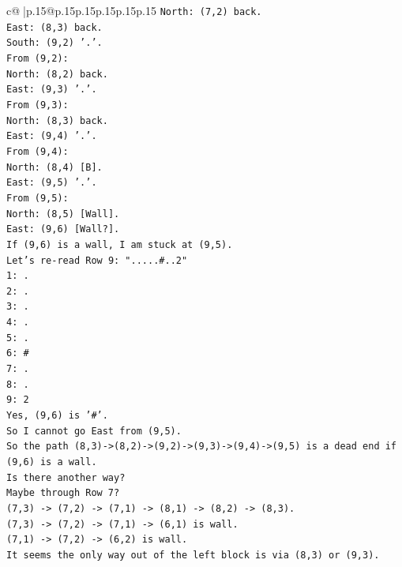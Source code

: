 \documentclass{article}
\begin{document}
{\begin{supertabular}{c@{$\;$}|p{.15\linewidth}@{}p{.15\linewidth}p{.15\linewidth}p{.15\linewidth}p{.15\linewidth}p{.15\linewidth}}
{{{\texttt{North: (7,2) back.} \\
\texttt{East: (8,3) back.} \\
\texttt{South: (9,2) '.'.} \\
\texttt{From (9,2):} \\
\texttt{North: (8,2) back.} \\
\texttt{East: (9,3) '.'.} \\
\texttt{From (9,3):} \\
\texttt{North: (8,3) back.} \\
\texttt{East: (9,4) '.'.} \\
\texttt{From (9,4):} \\
\texttt{North: (8,4) {[}B{]}.} \\
\texttt{East: (9,5) '.'.} \\
\texttt{From (9,5):} \\
\texttt{North: (8,5) {[}Wall{]}.} \\
\texttt{East: (9,6) {[}Wall?{]}.} \\
\texttt{If (9,6) is a wall, I am stuck at (9,5).} \\
\texttt{Let's re{-}read Row 9: ".....\#..2"} \\
\texttt{1: .} \\
\texttt{2: .} \\
\texttt{3: .} \\
\texttt{4: .} \\
\texttt{5: .} \\
\texttt{6: \#} \\
\texttt{7: .} \\
\texttt{8: .} \\
\texttt{9: 2} \\
\texttt{Yes, (9,6) is '\#'.} \\
\texttt{So I cannot go East from (9,5).} \\
\texttt{So the path (8,3){-}>(8,2){-}>(9,2){-}>(9,3){-}>(9,4){-}>(9,5) is a dead end if (9,6) is a wall.} \\
\texttt{Is there another way?} \\
\texttt{Maybe through Row 7?} \\
\texttt{(7,3) {-}> (7,2) {-}> (7,1) {-}> (8,1) {-}> (8,2) {-}> (8,3).} \\
\texttt{(7,3) {-}> (7,2) {-}> (7,1) {-}> (6,1) is wall.} \\
\texttt{(7,1) {-}> (7,2) {-}> (6,2) is wall.} \\
\texttt{It seems the only way out of the left block is via (8,3) or (9,3).} \\
}}}
\end{supertabular}}
\end{document}
